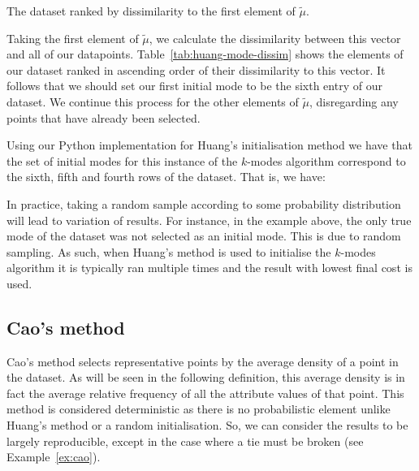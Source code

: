 \begin{example}
    \begin{table}[H]
    \centering
    \singlespacing{%
    \resizebox{.8\textwidth}{!}{%
        
    }}
    \caption{The dataset ranked by dissimilarity to the first element of
    \(\tilde{\mu}\).}\label{tab:huang-mode-dissim}
    \end{table}

    Taking the first element of \(\tilde{\mu}\), we calculate the dissimilarity
    between this vector and all of our datapoints.
    Table~\ref{tab:huang-mode-dissim} shows the elements of our dataset ranked
    in ascending order of their dissimilarity to this vector. It follows that we
    should set our first initial mode to be the sixth entry of our dataset. We
    continue this process for the other elements of \(\tilde{\mu}\),
    disregarding any points that have already been selected.
    
    Using our Python implementation for Huang's initialisation method we have 
    that the set of initial modes for this instance of the \(k\)-modes algorithm
    correspond to the sixth, fifth and fourth rows of the dataset. That is, we
    have:

    
\end{example}

\begin{remark}
    In practice, taking a random sample according to some probability
    distribution will lead to variation of results. For instance, in the example
    above, the only true mode of the dataset was not selected as an initial
    mode. This is due to random sampling. As such, when Huang's method is used
    to initialise the \(k\)-modes algorithm it is typically ran multiple times
    and the result with lowest final cost is used.
\end{remark}

\subsection{Cao's method}\label{subsec:cao}

Cao's method selects representative points by the average density of a point in
the dataset. As will be seen in the following definition, this average density 
is in fact the average relative frequency of all the attribute values of that 
point. This method is considered deterministic as there is no probabilistic
element \- unlike Huang's method or a random initialisation. So, we can consider
the results to be largely reproducible, except in the case where a tie must be
broken (see Example~\ref{ex:cao}).

